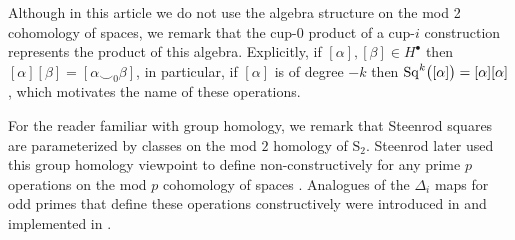 \begin{remark}
	Although in this article we do not use the algebra structure on the mod 2 cohomology of spaces, we remark that the cup-$0$ product of a cup-$i$ construction represents the product of this algebra.
	Explicitly, if $[\alpha], [\beta] \in H^\bullet$ then $[\alpha][\beta] = [\alpha \smallsmile_0 \beta]$, in particular, if $[\alpha]$ is of degree $-k$ then $\mathrm{Sq}^k\big([\alpha]\big) = [\alpha] [\alpha]$, which motivates the name of these operations.
\end{remark}

\begin{remark}
	For the reader familiar with group homology, we remark that Steenrod squares are parameterized by classes on the mod $2$ homology of $\mathrm S_2$.
	Steenrod later used this group homology viewpoint to define non-constructively for any prime $p$ operations on the mod $p$ cohomology of spaces \cite{steenrod1962cohomology}.
	Analogues of the $\Delta_i$ maps for odd primes that define these operations constructively were introduced in \cite{medina2020odd} and implemented in \cite{medina2021computer}.
\end{remark}